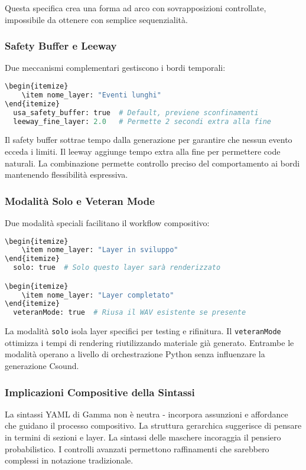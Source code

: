 Questa specifica crea una forma ad arco con sovrapposizioni controllate, impossibile da ottenere con semplice sequenzialità.
\subsubsection{Safety Buffer e Leeway}
Due meccanismi complementari gestiscono i bordi temporali:

\begin{lstlisting}[language=Python]
\begin{itemize}
    \item nome_layer: "Eventi lunghi"
\end{itemize}
  usa_safety_buffer: true  # Default, previene sconfinamenti
  leeway_fine_layer: 2.0   # Permette 2 secondi extra alla fine
\end{lstlisting}

Il safety buffer sottrae tempo dalla generazione per garantire che nessun evento ecceda i limiti. Il leeway aggiunge tempo extra alla fine per permettere code naturali. La combinazione permette controllo preciso del comportamento ai bordi mantenendo flessibilità espressiva.
\subsubsection{Modalità Solo e Veteran Mode}
Due modalità speciali facilitano il workflow compositivo:

\begin{lstlisting}[language=Python]
\begin{itemize}
    \item nome_layer: "Layer in sviluppo"
\end{itemize}
  solo: true  # Solo questo layer sarà renderizzato

\begin{itemize}
    \item nome_layer: "Layer completato"
\end{itemize}
  veteranMode: true  # Riusa il WAV esistente se presente
\end{lstlisting}

La modalità \texttt{solo} isola layer specifici per testing e rifinitura. Il \texttt{veteranMode} ottimizza i tempi di rendering riutilizzando materiale già generato. Entrambe le modalità operano a livello di orchestrazione Python senza influenzare la generazione Csound.
\subsubsection{Implicazioni Compositive della Sintassi}
La sintassi YAML di Gamma non è neutra - incorpora assunzioni e affordance che guidano il processo compositivo. La struttura gerarchica suggerisce di pensare in termini di sezioni e layer. La sintassi delle maschere incoraggia il pensiero probabilistico. I controlli avanzati permettono raffinamenti che sarebbero complessi in notazione tradizionale.

